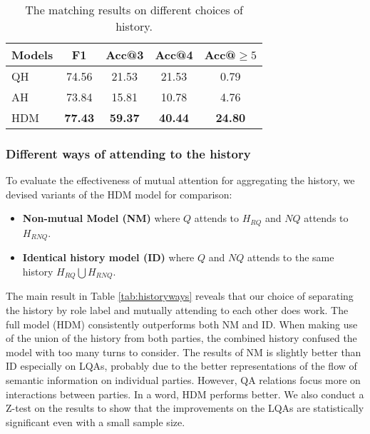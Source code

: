 \begin{table}[th]
	\scriptsize
	\centering
	\begin{tabular}{p{1.5cm}<{\centering}|c|ccc}
		\toprule[1.3pt]
		Models &F1&Acc@3&Acc@4&Acc@$\geq5$\\
		\midrule[1pt]
		QH&74.56&21.53&21.53&0.79 \\	
		AH&73.84&15.81&10.78&4.76 \\
		HDM&\textbf{77.43}&\textbf{59.37}&\textbf{40.44}&\textbf{24.80}\\
		\bottomrule[1.3pt]
	\end{tabular}
	\vspace{-0.25cm}
	\caption{The matching results on different choices of history.}
	\label{tab:historychoice}
\end{table}

\subsubsection*{Different ways of attending to the history}

To evaluate the effectiveness of mutual attention for aggregating the 
history, we devised variants of the HDM model for comparison:
\begin{itemize}
	\item \textbf{Non-mutual Model (NM)} where $Q$ attends to $H_{RQ}$ and $NQ$ attends to $H_{RNQ}$.%
	\item \textbf{Identical history model (ID)} where $Q$ and $NQ$ attends to the same history $H_{RQ}\bigcup H_{RNQ}$.%
\end{itemize}

The main result in Table \ref{tab:historyways} reveals that our choice 
of separating the history by role label and mutually attending to each other
does work. The full model (HDM) consistently outperforms both NM and ID. 
When making use of the union of the history from both parties, 
the combined history confused the model with too many turns to consider. 
The results of NM is slightly better than ID especially on LQAs, probably 
due to the better representations of the flow of semantic information on 
individual parties. However, QA relations focus more on interactions 
between parties. In a word, HDM performs better. We also conduct a Z-test on the 
results to show that the improvements on the LQAs are statistically 
significant even with a small sample size.

